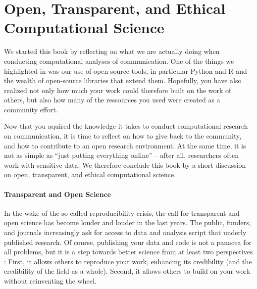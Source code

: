 


\section{Open, Transparent, and Ethical Computational Science}
\label{sec:ethics}


We started this book by reflecting on what we are actually doing when conducting computational analyses of communication.
One of the things we highlighted in  was our use of open-source tools, in particular Python and R
and the wealth of open-source libraries that extend them. Hopefully, you have also realized not only how much your work could
therefore built on the work of others, but also how many of the ressources you used were created as a community effort.

Now that you aquired the knowledge it takes to conduct computational research on communication, it is time to reflect
on how to give back to the community, and how to contribute to an open research environment. At the same time, it is
not as simple as ``just putting everything online'' -- after all, researchers often work with sensitive data. We therefore
conclude this book by a short discussion on open, transparent, and ethical computational science.


\paragraph{Transparent and Open Science}
In the wake of the so-called reproducibility crisis, the call for transparent and open science has become louder and louder
in the last years. The public, funders, and journals increasingly ask for access to data and analysis script that underly
published research. Of course, publishing your data and code is not a panacea for all problems, but it is a step towards
better science from at least two perspectives \citep{VanAtteveldt2019}: First, it allows others to reproduce your work, enhancing its credibility
(and the credibility of the field as a whole). Second, it allows others to build on your work without reinventing the wheel.

